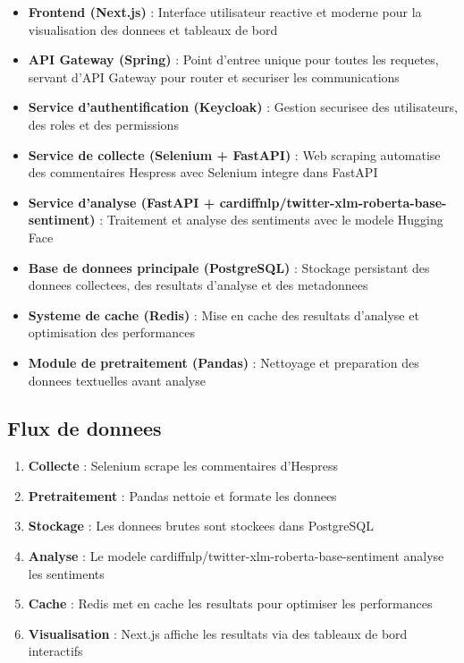 \begin{itemize}
    \item \textbf{Frontend (Next.js)} : Interface utilisateur reactive et moderne pour la visualisation des donnees et tableaux de bord
    \item \textbf{API Gateway (Spring)} : Point d'entree unique pour toutes les requetes, servant d'API Gateway pour router et securiser les communications
    \item \textbf{Service d'authentification (Keycloak)} : Gestion securisee des utilisateurs, des roles et des permissions
    \item \textbf{Service de collecte (Selenium + FastAPI)} : Web scraping automatise des commentaires Hespress avec Selenium integre dans FastAPI
    \item \textbf{Service d'analyse (FastAPI + cardiffnlp/twitter-xlm-roberta-base-sentiment)} : Traitement et analyse des sentiments avec le modele Hugging Face
    \item \textbf{Base de donnees principale (PostgreSQL)} : Stockage persistant des donnees collectees, des resultats d'analyse et des metadonnees
    \item \textbf{Systeme de cache (Redis)} : Mise en cache des resultats d'analyse et optimisation des performances
    \item \textbf{Module de pretraitement (Pandas)} : Nettoyage et preparation des donnees textuelles avant analyse
\end{itemize}

\subsection{Flux de donnees}

\begin{enumerate}
    \item \textbf{Collecte} : Selenium scrape les commentaires d'Hespress
    \item \textbf{Pretraitement} : Pandas nettoie et formate les donnees
    \item \textbf{Stockage} : Les donnees brutes sont stockees dans PostgreSQL
    \item \textbf{Analyse} : Le modele cardiffnlp/twitter-xlm-roberta-base-sentiment analyse les sentiments
    \item \textbf{Cache} : Redis met en cache les resultats pour optimiser les performances
    \item \textbf{Visualisation} : Next.js affiche les resultats via des tableaux de bord interactifs
\end{enumerate}

